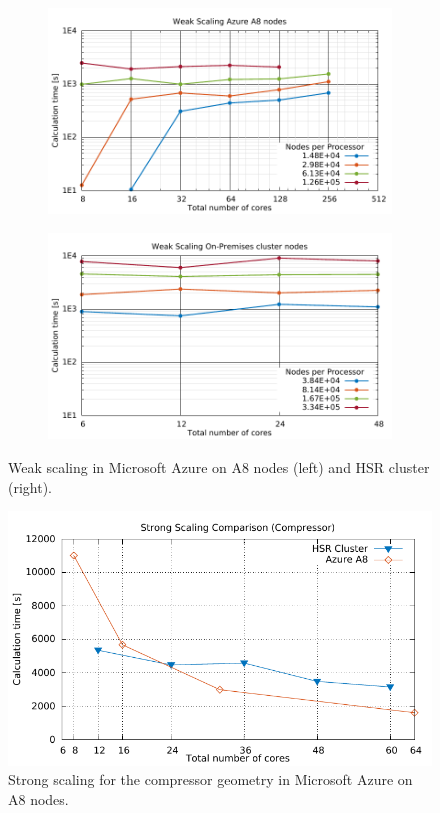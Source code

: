\documentclass[3p,times]{elsarticle}
\begin{document}
\begin{figure}
\centering
\begin{subfigure}{.4\textwidth}
	\centering
	\includegraphics[width=\linewidth]{gplt-a8-weak-pipe}	
\end{subfigure}
\begin{subfigure}{.4\textwidth}
	\centering
	\includegraphics[width=\linewidth]{gplt-hsr-weak-pipe}
\end{subfigure}

\caption{Weak scaling in Microsoft Azure on A8 nodes (left) and HSR cluster (right). }
\label{fig:weakPipe}
\end{figure}

\begin{figure}
	\centering
	\includegraphics[width=0.5\linewidth]{gplt-compressor}
	\caption{Strong scaling for the compressor geometry in Microsoft Azure on A8 nodes. }
	\label{fig:compressor}
\end{figure}
\end{document}
